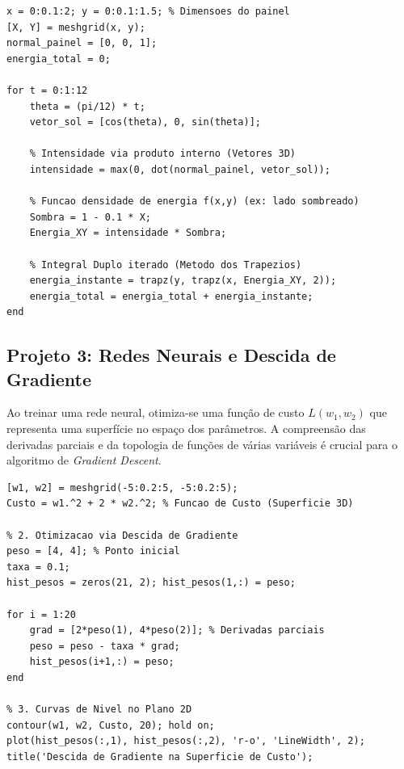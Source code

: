 \documentclass[12pt,a4paper]{article}
\begin{document}
\begin{lstlisting}[caption={Análise de Incidência Solar em MATLAB/Octave}]
x = 0:0.1:2; y = 0:0.1:1.5; % Dimensoes do painel
[X, Y] = meshgrid(x, y);
normal_painel = [0, 0, 1]; 
energia_total = 0;

for t = 0:1:12
    theta = (pi/12) * t; 
    vetor_sol = [cos(theta), 0, sin(theta)]; 
    
    % Intensidade via produto interno (Vetores 3D)
    intensidade = max(0, dot(normal_painel, vetor_sol));
    
    % Funcao densidade de energia f(x,y) (ex: lado sombreado)
    Sombra = 1 - 0.1 * X; 
    Energia_XY = intensidade * Sombra;
    
    % Integral Duplo iterado (Metodo dos Trapezios)
    energia_instante = trapz(y, trapz(x, Energia_XY, 2));
    energia_total = energia_total + energia_instante;
end
\end{lstlisting}

\subsection{Projeto 3: Redes Neurais e Descida de Gradiente}
Ao treinar uma rede neural, otimiza-se uma função de custo $L(w_1, w_2)$ que representa uma superfície no espaço dos parâmetros. A compreensão das derivadas parciais e da topologia de funções de várias variáveis é crucial para o algoritmo de \textit{Gradient Descent}.

\begin{lstlisting}[caption={Otimização em Superfície de Erro (Redes Neurais)}]
% 1. Espaco de Parametros (Pesos w1, w2)
[w1, w2] = meshgrid(-5:0.2:5, -5:0.2:5);
Custo = w1.^2 + 2 * w2.^2; % Funcao de Custo (Superficie 3D)

% 2. Otimizacao via Descida de Gradiente
peso = [4, 4]; % Ponto inicial
taxa = 0.1;
hist_pesos = zeros(21, 2); hist_pesos(1,:) = peso;

for i = 1:20
    grad = [2*peso(1), 4*peso(2)]; % Derivadas parciais
    peso = peso - taxa * grad;
    hist_pesos(i+1,:) = peso;
end

% 3. Curvas de Nivel no Plano 2D
contour(w1, w2, Custo, 20); hold on;
plot(hist_pesos(:,1), hist_pesos(:,2), 'r-o', 'LineWidth', 2);
title('Descida de Gradiente na Superficie de Custo');
\end{lstlisting}
\end{document}
